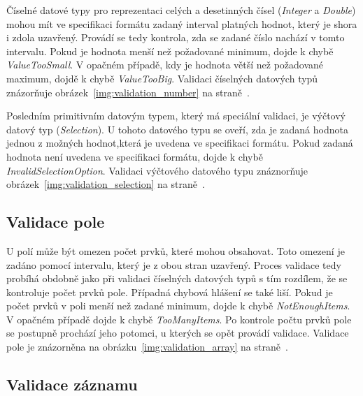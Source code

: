 \documentclass[FM,bw,DP]{tulthesis}
\begin{document}
Číselné datové typy pro reprezentaci celých a desetinných čísel (\textit{Integer} a \textit{Double}) mohou mít ve specifikaci formátu zadaný interval platných hodnot, který je shora i zdola uzavřený. Provádí se tedy kontrola, zda se zadané číslo nachází v tomto intervalu. Pokud je hodnota menší než požadované minimum, dojde k chybě \textit{ValueTooSmall}. V opačném případě, kdy je hodnota větší než požadované maximum, dojdě k chybě \textit{ValueTooBig}. Validaci číselných datových typů znázorňuje obrázek~\ref{img:validation_number} na straně~\pageref{img:validation_number}.

Posledním primitivním datovým typem, který má speciální validaci, je výčtový datový typ (\textit{Selection}). U tohoto datového typu se oveří, zda je zadaná hodnota jednou z možných hodnot,která je uvedena ve specifikaci formátu. Pokud zadaná hodnota není uvedena ve specifikaci formátu, dojde k chybě \textit{InvalidSelectionOption}. Validaci výčtového datového typu znáznorňuje obrázek~\ref{img:validation_selection} na straně~\pageref{img:validation_selection}.

\subsection{Validace pole}

U polí může být omezen počet prvků, které mohou obsahovat. Toto omezení je zadáno pomocí intervalu, který je z obou stran uzavřený. Proces validace tedy probíhá obdobně jako při validaci číselných datových typů s tím rozdílem, že se kontroluje počet prvků pole. Případná chybová hlášení se také liší. Pokud je počet prvků v poli menší než zadané minimum, dojde k chybě \textit{NotEnoughItems}. V opačném případě dojde k chybě \textit{TooManyItems}. Po kontrole počtu prvků pole se postupně prochází jeho potomci, u kterých se opět provádí validace. Validace pole je znázorněna na obrázku~\ref{img:validation_array} na straně~\pageref{img:validation_array}.

\subsection{Validace záznamu}
\end{document}
